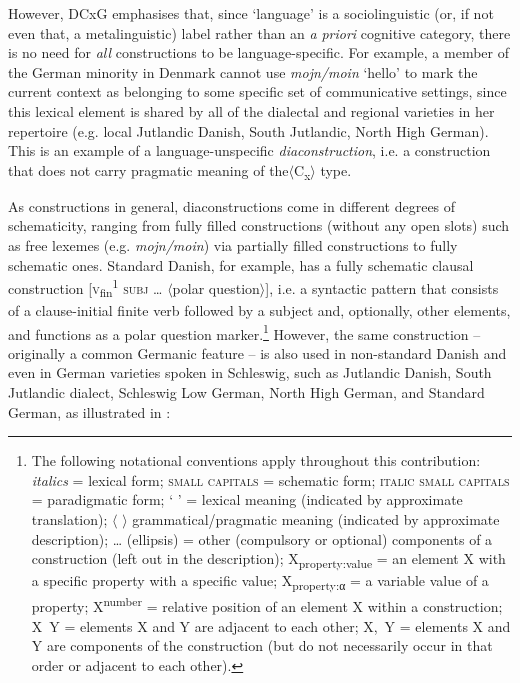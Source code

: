 \documentclass[output=paper]{langsci/langscibook}
\begin{document}
However, DCxG emphasises that, since ‘language’ is a sociolinguistic (or, if not even that, a metalinguistic) label rather than an \textit{a} \textit{priori} cognitive category, there is no need for \textit{all} constructions to be language-specific. For example, a member of the German minority in Denmark cannot use \textit{mojn/moin} ‘hello’ to mark the current context as belonging to some specific set of communicative settings, since this lexical element is shared by all of the dialectal and regional varieties in her repertoire (e.g. local Jutlandic Danish, South Jutlandic, North High German). This is an example of a language-unspecific \textit{diaconstruction}, i.e. a construction that does not carry pragmatic meaning of the$\langle$C\textsubscript{x}$\rangle$ type.

As constructions in general, diaconstructions come in different degrees of schematicity, ranging from fully filled constructions (without any open slots) such as free lexemes (e.g. \textit{mojn/moin}) via partially filled constructions to fully schematic ones. Standard Danish, for example, has a fully schematic clausal construction {[}\textsc{v}\textsubscript{fin}\textsuperscript{1} \textsc{subj} … $\langle$polar question$\rangle${]}, i.e. a syntactic pattern that consists of a clause-initial finite verb followed by a subject and, optionally, other elements, and functions as a polar question marker.\footnote{The following notational conventions apply throughout this contribution: \textit{italics} = lexical form; \textsc{small} \textsc{capitals} = schematic form; \textsc{italic} \textsc{small} \textsc{capitals} = paradigmatic form; ‘ ’ = lexical meaning (indicated by approximate translation); {$\langle$} {$\rangle$} grammatical/pragmatic meaning (indicated by approximate description); … (ellipsis) = other (compulsory or optional) components of a construction (left out in the description); X\textsubscript{property:value} = an element X with a specific property with a specific value; X\textsubscript{property:α} = a variable value of a property; X\textsuperscript{number} = relative position of an element X within a construction; X~Y = elements X and Y are adjacent to each other; X,~Y = elements X and Y are components of the construction (but do not necessarily occur in that order or adjacent to each other).} However, the same construction – {originally a common Germanic feature –} is also used in non-standard Danish and even in German varieties spoken in Schleswig, such as Jutlandic Danish, South Jutlandic dialect, Schleswig Low German, North High German, and Standard German, as illustrated in :
\end{document}
